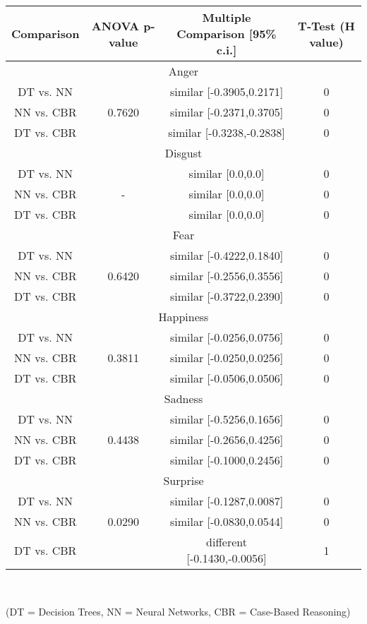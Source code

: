 \documentclass[a4paper]{article}
\begin{document}
\begin{center}
  \begin{tabular}{|c|c|c|c|}
  \hline
    {\bf Comparison} & {\bf ANOVA p-value} & {\bf Multiple Comparison [95\% c.i.]} & {\bf T-Test (H value)} \\
    \hline
    \multicolumn{4}{|c|}{Anger} \\ \hline
	DT vs. NN 	& 			& similar [-0.3905,0.2171] 	& 0 \\
	NN vs. CBR 	& 0.7620 	& similar [-0.2371,0.3705]	& 0 \\
	DT vs. CBR 	& 			& similar [-0.3238,-0.2838] & 0 \\
	\hline
    \multicolumn{4}{|c|}{Disgust} \\ \hline
	DT vs. NN 	& 			& similar [0.0,0.0]	& 0 \\
	NN vs. CBR 	& -		 	& similar [0.0,0.0]	& 0 \\
	DT vs. CBR 	& 			& similar [0.0,0.0]	& 0 \\
	\hline
	\multicolumn{4}{|c|}{Fear} \\ \hline
	DT vs. NN 	& 			& similar [-0.4222,0.1840]	& 0 \\
	NN vs. CBR 	& 0.6420	& similar [-0.2556,0.3556]	& 0 \\
	DT vs. CBR 	& 			& similar [-0.3722,0.2390]	& 0 \\
	\hline
	\multicolumn{4}{|c|}{Happiness} \\ \hline
	DT vs. NN 	& 			& similar [-0.0256,0.0756]	& 0 \\
	NN vs. CBR 	& 0.3811 	& similar [-0.0250,0.0256]	& 0 \\
	DT vs. CBR 	& 			& similar [-0.0506,0.0506]	& 0 \\
	\hline
	\multicolumn{4}{|c|}{Sadness} \\ \hline
	DT vs. NN 	& 			& similar [-0.5256,0.1656]	& 0 \\
	NN vs. CBR 	& 0.4438 	& similar [-0.2656,0.4256]	& 0 \\
	DT vs. CBR 	& 			& similar [-0.1000,0.2456]	& 0 \\
	\hline
	\multicolumn{4}{|c|}{Surprise} \\ \hline
	DT vs. NN 	& 			& similar [-0.1287,0.0087]	& 0 \\
	NN vs. CBR 	& 0.0290 	& similar [-0.0830,0.0544]	& 0 \\
	DT vs. CBR 	& 			& different [-0.1430,-0.0056]	& 1 \\
	\hline
  \end{tabular}\\
 \end{center}
 (DT = Decision Trees, NN = Neural Networks, CBR = Case-Based Reasoning)\\
 
\end{document}

